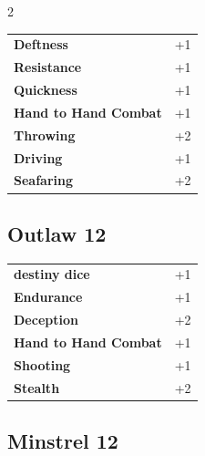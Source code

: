 \begin{multicols}{2}
\begin{tcolorbox}
\begin{tabular}{@{}ll@{}}
    \textbf{Deftness} & +1\\
    \textbf{Resistance} & +1\\
    \textbf{Quickness} & +1\\
    \textbf{Hand to Hand Combat} & +1\\
    \textbf{Throwing} & +2\\
    \textbf{Driving} & +1\\
    \textbf{Seafaring} & +2\\
\end{tabular}


\end{tcolorbox}

\begin{tcolorbox}
    \subsection*{Outlaw \hfill \small{12 }}
    \tcblower




\begin{tabular}{@{}ll@{}}
    \textbf{destiny dice} & +1\\
    \textbf{Endurance} & +1\\
    \textbf{Deception} & +2\\
    \textbf{Hand to Hand Combat} & +1\\
    \textbf{Shooting} & +1\\
    \textbf{Stealth} & +2\\
\end{tabular}


\end{tcolorbox}

\begin{tcolorbox}
    \subsection*{Minstrel \hfill \small{12 }}
    \tcblower





\end{tcolorbox}
\end{multicols}
